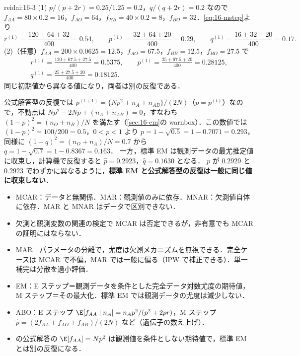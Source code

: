 \begin{kaitou}{reidai:16-3}
(1) $p/(p+2r)=0.25/1.25=0.2$，$q/(q+2r)=0.2$ なので
$f_{AA}=80\times0.2=16$，$f_{AO}=64$，$f_{BB}=40\times0.2=8$，$f_{BO}=32$．\cref{eq:16-mstep}より
\[
r^{(1)}=\frac{120+64+32}{400}=0.54,\qquad p^{(1)}=\frac{32+64+20}{400}=0.29,\qquad q^{(1)}=\frac{16+32+20}{400}=0.17 .
\]
(2)（任意）$f_{AA}=200\times0.0625=12.5$，$f_{AO}=67.5$，$f_{BB}=12.5$，$f_{BO}=27.5$ で
\begin{gather*}
r^{(1)}=\frac{120+67.5+27.5}{400}=0.5375,\qquad p^{(1)}=\frac{25+67.5+20}{400}=0.28125,\\
q^{(1)}=\frac{25+27.5+20}{400}=0.18125 .
\end{gather*}
同じ初期値から異なる値になり，両者は別の反復である．
\end{kaitou}
\begin{supbox}[補足：公式解答型の反復の極限]
公式解答型の反復では $p^{(t+1)}=\{Np^2+n_A+n_{AB}\}/(2N)$（$p=p^{(t)}$）なので，不動点は $Np^2-2Np+(n_A+n_{AB})=0$，すなわち
$(1-p)^2=(n_O+n_B)/N$ を満たす（\cref{sec:16-em}の warnbox）．この数値では $(1-p)^2=100/200=0.5$，$0<p<1$ より $p=1-\sqrt{0.5}=1-0.7071=0.293$，
同様に $(1-q)^2=(n_O+n_A)/N=0.7$ から $q=1-\sqrt{0.7}=1-0.8367=0.163$．
一方，標準 EM は観測データの最尤推定値に収束し，計算機で反復すると $\hat p=0.2923$，$\hat q=0.1630$ となる．
$p$ が $0.2929$ と $0.2923$ でわずかに異なるように，\textbf{標準 EM と公式解答型の反復は一般に同じ値に収束しない}．
\end{supbox}

\begin{summarybox}
\begin{itemize}
\item MCAR：データと無関係．MAR：観測値のみに依存．MNAR：欠測値自体に依存．MAR と MNAR はデータで区別できない．
\item 欠測と観測変数の関連の検定で MCAR は否定できるが，非有意でも MCAR の証明にはならない．
\item MAR＋パラメータの分離で，尤度は欠測メカニズムを無視できる．完全ケースは MCAR で不偏，MAR では一般に偏る（IPW で補正できる）．単一補完は分散を過小評価．
\item EM：E ステップ＝観測データを条件とした完全データ対数尤度の期待値，M ステップ＝その最大化．標準 EM では観測データの尤度は減少しない．
\item ABO：E ステップ $\E[f_{AA}\mid n_A]=n_Ap^2/(p^2+2pr)$，M ステップ $\hat p=(2f_{AA}+f_{AO}+f_{AB})/(2N)$ など（遺伝子の数え上げ）．
\item {} の公式解答の $\E[f_{AA}]=Np^2$ は観測値を条件としない期待値で，標準 EM とは別の反復になる．
\end{itemize}
\end{summarybox}
